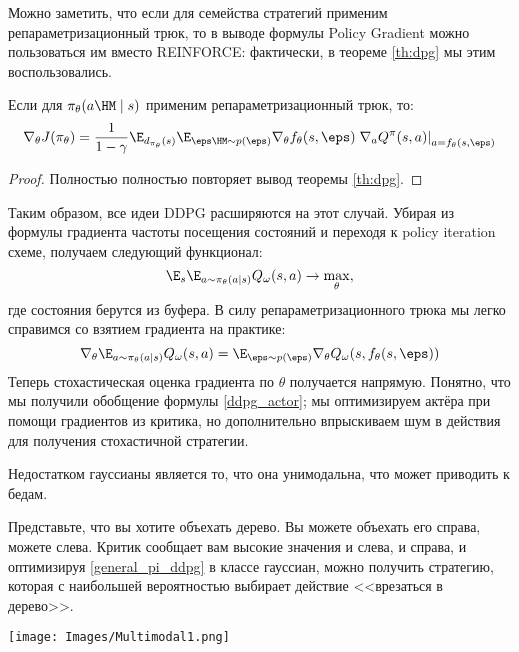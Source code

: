 Можно заметить, что если для семейства стратегий применим репараметризационный трюк, то в выводе формулы Policy Gradient можно пользоваться им вместо REINFORCE: фактически, в теореме \ref{th:dpg} мы этим воспользовались.

\begin{theorem}
Если для $\pi_\theta(a \HM\mid s)$ применим репараметризационный трюк, то:
\begin{equation}\label{rt_dpg}
\nabla_\theta J(\pi_\theta) = \frac{1}{1 - \gamma}\E_{d_{\pi_\theta}(s)} \E_{\eps \HM\sim p(\eps)} \nabla_\theta f_\theta(s, \eps) \left. \nabla_a Q^{\pi}(s, a) \right|_{a = f_\theta(s, \eps)}
\end{equation}
\begin{proof}
Полностью полностью повторяет вывод теоремы \ref{th:dpg}.
\end{proof}
\end{theorem}

Таким образом, все идеи DDPG расширяются на этот случай. Убирая из формулы градиента частоты посещения состояний и переходя к policy iteration схеме, получаем следующий функционал:
\begin{equation}\label{general_pi_ddpg}
\E_s \E_{a \sim \pi_\theta(a \mid s)} Q_\omega(s, a) \to \max_{\theta},
\end{equation}
где состояния берутся из буфера. В силу репараметризационного трюка мы легко справимся со взятием градиента на практике:
\begin{equation*}
\nabla_\theta \E_{a \sim \pi_\theta(a \mid s)} Q_\omega(s, a) = \E_{\eps \sim p(\eps)} \nabla_\theta Q_\omega(s, f_{\theta}(s, \eps))
\end{equation*}
Теперь стохастическая оценка градиента по $\theta$ получается напрямую. Понятно, что мы получили обобщение формулы \eqref{ddpg_actor}; мы оптимизируем актёра при помощи градиентов из критика, но дополнительно впрыскиваем шум в действия для получения стохастичной стратегии. 

Недостатком гауссианы является то, что она унимодальна, что может приводить к бедам.

\begin{exampleBox}[righthand ratio=0.35, sidebyside, sidebyside align=center, lower separated=false]{}
Представьте, что вы хотите объехать дерево. Вы можете объехать его справа, можете слева. Критик сообщает вам высокие значения и слева, и справа, и оптимизируя \eqref{general_pi_ddpg} в классе гауссиан, можно получить стратегию, которая с наибольшей вероятностью выбирает действие <<врезаться в дерево>>.

\tcblower
\texttt{[image: Images/Multimodal1.png]}
\end{exampleBox}

